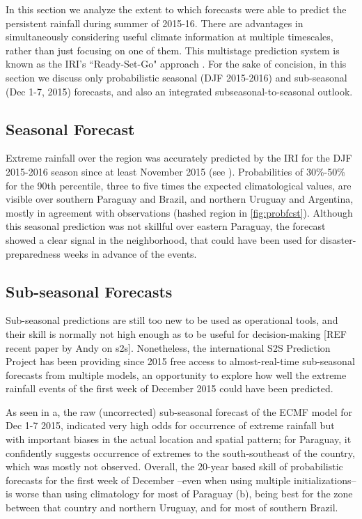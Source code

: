 \documentclass[twocol]{ametsoc}
\begin{document}
In this section we analyze the extent to which forecasts were able to predict the persistent rainfall during summer of 2015-16. There are advantages in simultaneously considering useful climate information at multiple timescales, rather than just focusing on one of them. This multistage prediction system is known as the IRI's ``Ready-Set-Go" approach \citep{Goddard:2014kf,Munoz2016}.
For the sake of concision, in this section we discuss only probabilistic seasonal (DJF 2015-2016) and sub-seasonal (Dec 1-7, 2015) forecasts, and also an integrated subseasonal-to-seasonal outlook.

\subsection{Seasonal Forecast}

Extreme rainfall over the region was accurately predicted by the IRI for the DJF 2015-2016 season since at least November 2015 (see ). Probabilities of 30\%-50\% for the 90th percentile, three to five times the expected climatological values, are visible over southern Paraguay and Brazil, and northern Uruguay and Argentina, mostly in agreement with observations (hashed region in \cref{fig:probfcst}).
Although this seasonal prediction was not skillful over eastern Paraguay, the forecast  showed a clear signal in the neighborhood, that could have been used for disaster-preparedness weeks in advance of the events.

\subsection{Sub-seasonal Forecasts}
Sub-seasonal predictions are still too new to be used as operational tools, and their skill is normally not high enough as to be useful for decision-making [REF recent paper by Andy on s2s]. Nonetheless, the international S2S Prediction Project \citep{Vitart2016} has been providing since 2015 free access to almost-real-time sub-seasonal forecasts from multiple models, an opportunity to explore how well the extreme rainfall events of the first week of December 2015 could have been predicted.

As seen in a, the raw (uncorrected) sub-seasonal forecast of the ECMF model for Dec 1-7 2015, indicated very high odds for occurrence of extreme rainfall but with important biases in the actual location and spatial pattern; for Paraguay, it confidently suggests occurrence of extremes to the south-southeast of the country, which was mostly not observed. Overall, the 20-year based skill of probabilistic forecasts for the first week of December --even when using multiple initializations-- is worse than using climatology for most of Paraguay (b), being best for the zone between that country and northern Uruguay, and for most of southern Brazil.
\end{document}

